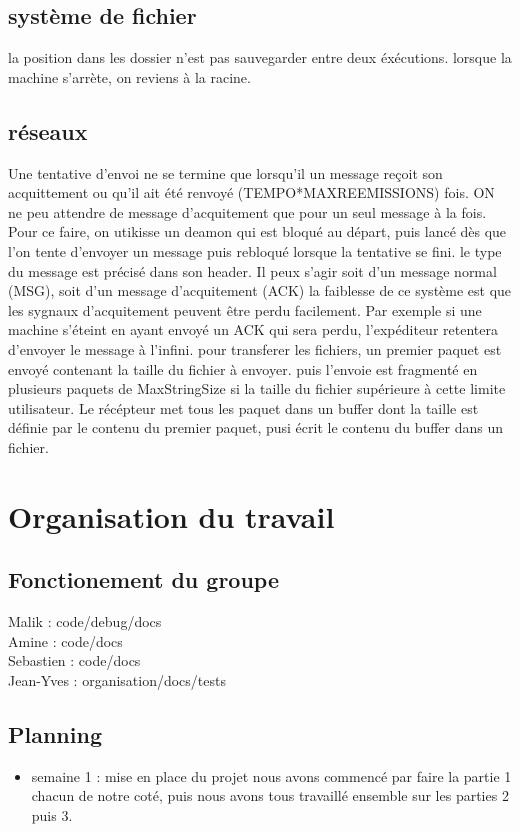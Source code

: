 \documentclass{article}
\begin{document}
{	\subsection{système de fichier}
la position dans les dossier n'est pas sauvegarder entre deux éxécutions.
lorsque la machine s'arrète, on reviens à la racine.

	\subsection{réseaux}
		Une tentative d'envoi ne se termine que lorsqu'il un message reçoit son acquittement ou qu'il ait été renvoyé (TEMPO*MAXREEMISSIONS) fois. ON ne peu attendre de message d'acquitement que pour un seul message à la fois. Pour ce faire, on utikisse un deamon qui est bloqué au départ, puis lancé dès que l'on tente d'envoyer un message puis rebloqué lorsque la tentative se fini.
		le type du message est précisé dans son header. Il peux s'agir soit d'un message normal (MSG), soit d'un message d'acquitement (ACK)
		la faiblesse de ce système est que les sygnaux d'acquitement peuvent être perdu facilement. Par exemple si une machine s'éteint en ayant envoyé un ACK qui sera perdu, l'expéditeur retentera d'envoyer le message à l'infini.
		pour transferer les fichiers, un premier paquet est envoyé contenant la taille du fichier à envoyer. puis l'envoie est fragmenté en plusieurs paquets de MaxStringSize si la taille du fichier supérieure à cette limite utilisateur. Le récépteur met tous les paquet dans un buffer dont la taille est définie par le contenu du premier paquet, pusi écrit le contenu du buffer dans un fichier.
		

\section{Organisation du travail}
	\subsection{Fonctionement du groupe}
		Malik : code/debug/docs\\
		Amine : code/docs\\
		Sebastien : code/docs\\
		Jean-Yves : organisation/docs/tests\\

	\subsection{Planning}
	\begin{itemize}
		\item semaine 1 :
			\subitem mise en place du projet
			\subitem nous avons commencé par faire la partie 1 chacun de notre coté,
			\subitem puis nous avons tous travaillé ensemble sur les parties 2 puis 3.


\end{itemize}}
\end{document}
